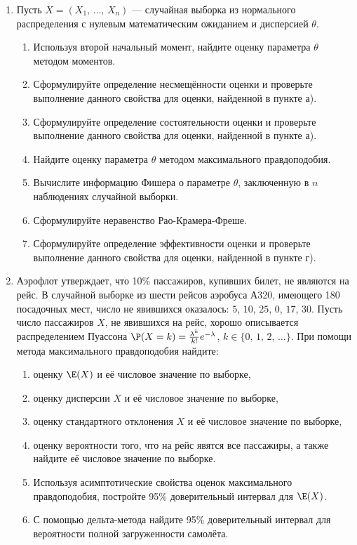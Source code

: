 \begin{enumerate}
\item
Пусть $X = (X_1, \, \ldots, \, X_n)$ — случайная выборка из нормального распределения с нулевым математическим ожиданием и дисперсией $\theta$.
\begin{enumerate}
  \item Используя второй начальный момент, найдите оценку параметра $\theta$ методом моментов.
  \item Сформулируйте определение несмещённости оценки и проверьте выполнение данного свойства для оценки, найденной в пункте а).
  \item Сформулируйте определение состоятельности оценки и проверьте выполнение данного свойства для оценки, найденной в пункте а).
  \item Найдите оценку параметра $\theta$ методом максимального правдоподобия.
  \item Вычислите информацию Фишера о параметре $\theta$, заключенную в $n$ наблюдениях случайной выборки.
  \item Сформулируйте неравенство Рао-Крамера-Фреше.
  \item Сформулируйте определение эффективности оценки и проверьте выполнение данного свойства для оценки, найденной в пункте г).
\end{enumerate}

\item
Аэрофлот утверждает, что 10\% пассажиров, купивших билет, не являются на рейс. В случайной выборке из шести рейсов аэробуса А320, имеющего 180 посадочных мест, число не явившихся оказалось: $5$, $10$, $25$, $0$, $17$, $30$. Пусть число пассажиров $X$, не явившихся на рейс, хорошо описывается распределением Пуассона $\P(X = k) = \tfrac{\lambda^{k}}{k!}e^{-\lambda}$, $k \in \{0,\, 1,\, 2,\, \ldots\}$. При помощи метода максимального правдоподобия найдите:
\begin{enumerate}
  \item оценку $\E(X)$ и её числовое значение по выборке,
  \item оценку дисперсии $X$ и её числовое значение по выборке,
  \item оценку стандартного отклонения $X$ и её числовое значение по выборке,
  \item оценку вероятности того, что на рейс явятся все пассажиры, а также найдите её числовое значение по выборке.
  \item Используя асимптотические свойства оценок максимального правдоподобия, постройте 95\% доверительный интервал для $\E(X)$.
  \item С помощью дельта-метода найдите 95\% доверительный интервал для вероятности полной загруженности самолёта.
\end{enumerate}

\end{enumerate}

